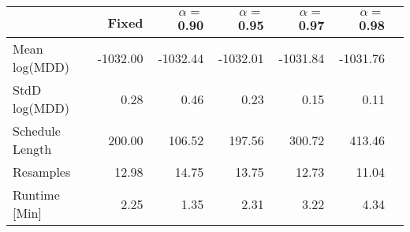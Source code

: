 \begin{tabular} {lrrrrrr} 
 \hline \hline 
&Fixed&$\alpha = $0.90&$\alpha = $0.95&$\alpha = $0.97&$\alpha = $0.98\\ 
 \hline 
Mean log(MDD)&-1032.00&-1032.44&-1032.01&-1031.84&-1031.76\\ 
StdD log(MDD)&0.28&0.46&0.23&0.15&0.11\\ 
Schedule Length&200.00&106.52&197.56&300.72&413.46\\ 
Resamples&12.98&14.75&13.75&12.73&11.04\\ 
Runtime [Min]&2.25&1.35&2.31&3.22&4.34\\ 
\hline 
\end{tabular}